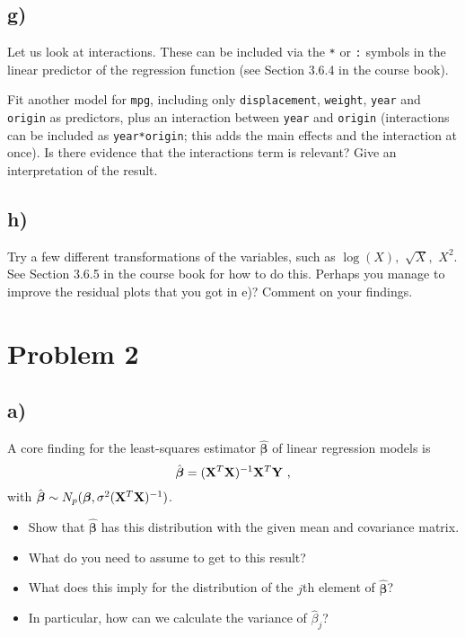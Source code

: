 \documentclass[
]{article}
\providecommand{\tightlist}{%
  \setlength{\itemsep}{0pt}\setlength{\parskip}{0pt}}
\begin{document}
\hypertarget{g}{%
\subsection{g)}\label{g}}

Let us look at interactions. These can be included via the \texttt{*} or
\texttt{:} symbols in the linear predictor of the regression function
(see Section 3.6.4 in the course book).

Fit another model for \texttt{mpg}, including only
\texttt{displacement}, \texttt{weight}, \texttt{year} and
\texttt{origin} as predictors, plus an interaction between \texttt{year}
and \texttt{origin} (interactions can be included as
\texttt{year*origin}; this adds the main effects and the interaction at
once). Is there evidence that the interactions term is relevant? Give an
interpretation of the result.

\hypertarget{h}{%
\subsection{h)}\label{h}}

Try a few different transformations of the variables, such as
\(\log(X),\) \(\sqrt{X},\) \(X^2\). See Section 3.6.5 in the course book
for how to do this. Perhaps you manage to improve the residual plots
that you got in e)? Comment on your findings.

\hypertarget{problem-2}{%
\section{Problem 2}\label{problem-2}}

\hypertarget{a-1}{%
\subsection{a)}\label{a-1}}

A core finding for the least-squares estimator
\(\hat{\boldsymbol\beta}\) of linear regression models is
\[ \hat{\boldsymbol\beta} = ({\bf X}^T{\bf X})^{-1} {\bf X}^T {\bf Y} \ , \]
with
\(\hat{\boldsymbol\beta}\sim N_{p}(\boldsymbol\beta,\sigma^2({\bf X}^T{\bf X})^{-1})\).

\begin{itemize}
\tightlist
\item
  Show that \(\hat{\boldsymbol\beta}\) has this distribution with the
  given mean and covariance matrix.
\item
  What do you need to assume to get to this result?
\item
  What does this imply for the distribution of the \(j\)th element of
  \(\hat{\boldsymbol\beta}\)?
\item
  In particular, how can we calculate the variance of \(\hat{\beta}_j\)?
\end{itemize}
\end{document}
